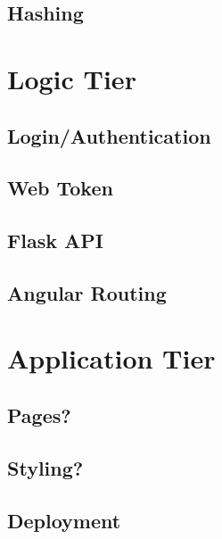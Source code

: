 \subsection{Hashing}

\section{Logic Tier}
\subsection{Login/Authentication}
\subsection{Web Token}
\subsection{Flask API}
\subsection{Angular Routing}

\section{Application Tier}
\subsection{Pages?}
\subsection{Styling?}
\subsection{Deployment}
